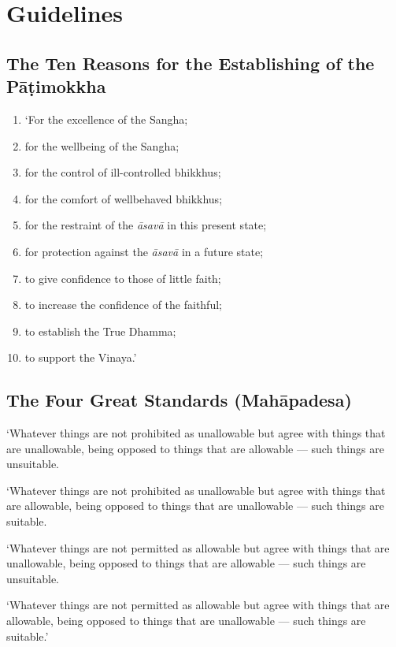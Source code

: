 \chapter{Guidelines}

\section[Establishing of the Pāṭimokkha]{The Ten Reasons for the Establishing of the Pāṭimokkha}

\begin{enumerate}

\item `For the excellence of the Sangha;
\item for the wellbeing of the Sangha;
\item for the control of ill-controlled bhikkhus;
\item for the comfort of wellbehaved bhikkhus;
\item for the restraint of the \emph{āsavā} in this present state;
\item for protection against the \emph{āsavā} in a future state;
\item to give confidence to those of little faith;
\item to increase the confidence of the faithful;
\item to establish the True Dhamma;
\item to support the Vinaya.'

\end{enumerate}


\section{The Four Great Standards (Mahāpadesa)}

`Whatever things are not prohibited as unallowable but agree with things that
are unallowable, being opposed to things that are allowable — such things are
unsuitable.

`Whatever things are not prohibited as unallowable but agree with things that
are allowable, being opposed to things that are unallowable — such things are
suitable.

`Whatever things are not permitted as allowable but agree with things that are
unallowable, being opposed to things that are allowable — such things are
unsuitable.

`Whatever things are not permitted as allowable but agree with things that are
allowable, being opposed to things that are unallowable — such things are
suitable.'


